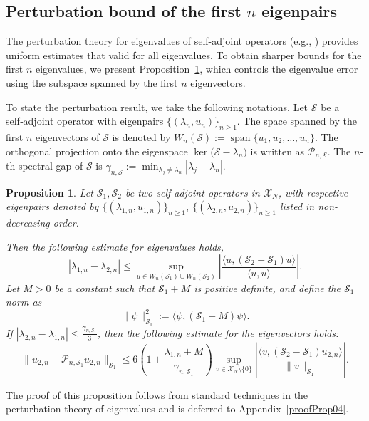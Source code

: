 \documentclass{sn-jnl}%
\numberwithin{equation}{section}
\theoremstyle{thmstyleone}%
\newtheorem{proposition}[theorem]{Proposition}%
\theoremstyle{thmstyletwo}%
\theoremstyle{thmstylethree}%
\begin{document}
\subsection{Perturbation bound of the first \texorpdfstring{$n$}{n} eigenpairs}
\label{subsec:proofFM-3}
The perturbation theory for eigenvalues of self-adjoint operators (e.g., \cite{kato2013perturbation}) provides uniform estimates that valid for all eigenvalues. To obtain sharper bounds for the first $n$ eigenvalues, we present Proposition~\ref{Prop04}, which controls the eigenvalue error using the subspace spanned by the first $n$ eigenvectors.

To state the perturbation result, we take the following notations.
Let $\mathcal{S}$ be a self‑adjoint operator with eigenpairs $\{(\lambda_n, u_n)\}_{n \geq 1}$.  The space spanned by the first $n$ eigenvectors of $\mathcal{S}$ is denoted by
    $
    W_n(\mathcal{S}) := \operatorname{span}\{ u_1,u_2,\dots ,u_n\}.
    $
The orthogonal projection onto the eigenspace $\ker\big(\mathcal{S}-\lambda_n\big)$ is written as $\mathcal{P}_{n,\mathcal{S}}$.
The $n$-th spectral gap of $\mathcal{S}$ is
    $
    \gamma_{n,\mathcal{S}} := \min_{\lambda_j \neq \lambda_n} |\lambda_j-\lambda_n|.
    $

\begin{proposition}
    \label{Prop04}
    Let $\mathcal{S}_1, \mathcal{S}_2$ be two self-adjoint operators in $\mathscr{X}_N$, with respective eigenpairs denoted by $\{(\lambda_{1,n},u_{1,n})\}_{n\geq 1},\ \{(\lambda_{2,n},u_{2,n})\}_{n\geq1}$ listed in non-decreasing order. 

    Then the following estimate for eigenvalues holds,
    \begin{equation}\label{Eq-prop04-01}
        |\lambda_{1,n}-\lambda_{2,n}|\leq \sup_{u\in W_n(\mathcal{S}_1)\cup W_n(\mathcal{S}_2)} \left|\frac{\langle u,(\mathcal{S}_2-\mathcal{S}_1)u\rangle}{\langle u,u\rangle}\right|.
    \end{equation}
   Let $M > 0$ be a constant such that $\mathcal{S}_1 + M$ is positive definite, and define the $\mathcal{S}_1$ norm as 
    \[
    \|\psi\|_{\mathcal{S}_1}^2 := \langle \psi, (\mathcal{S}_1 + M)\psi \rangle.
    \]
    If $ |\lambda_{2,n} - \lambda_{1,n}| \leq \frac{\gamma_{n,\mathcal{S}_1}}{3} $,
    then the following estimate for the eigenvectors holds:
    \begin{equation}\label{Eq-prop04-02}
        \| u_{2,n}-\mathcal{P}_{n,\mathcal{S}_1}u_{2,n}\| _{\mathcal{S}_1}\leq 6(1+\frac{\lambda_{1,n}+M}{\gamma_{n,\mathcal{S}_1}})\sup_{v\in \mathscr{X}_N\setminus\{0\}}\left|\frac{\langle v,(\mathcal{S}_2-\mathcal{S}_1)u_{2,n}\rangle}{\|v\|_{\mathcal{S}_1}}\right|.
    \end{equation}
\end{proposition}
The proof of this proposition follows from standard techniques in the perturbation theory of eigenvalues and is deferred to Appendix~\ref{proofProp04}.
\end{document}
